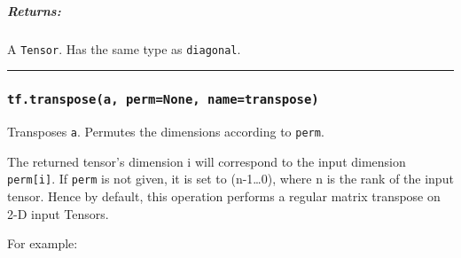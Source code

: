 \subparagraph{Returns: }\label{returns-23}

A \texttt{Tensor}. Has the same type as \texttt{diagonal}.

\begin{center}\rule{0.5\linewidth}{\linethickness}\end{center}

\subsubsection{\texorpdfstring{\texttt{tf.transpose(a,\ perm=None,\ name=\textquotesingle{}transpose\textquotesingle{})}
}{tf.transpose(a, perm=None, name='transpose') }}\label{tf.transposea-permnone-nametranspose}

Transposes \texttt{a}. Permutes the dimensions according to
\texttt{perm}.

The returned tensor's dimension i will correspond to the input dimension
\texttt{perm{[}i{]}}. If \texttt{perm} is not given, it is set to
(n-1\ldots{}0), where n is the rank of the input tensor. Hence by
default, this operation performs a regular matrix transpose on 2-D input
Tensors.

For example:

\begin{Shaded}
\begin{Highlighting}[]
\CommentTok{# 'x' is [[1 2 3]}
\CommentTok{#         [4 5 6]]}
\OperatorTok{==>} \NormalTok{[[} \NormalTok{]}
                     \NormalTok{[} \NormalTok{]}
                     \NormalTok{[} \NormalTok{]]}

\OperatorTok{=}\NormalTok{[}\NormalTok{, }\NormalTok{]) }\OperatorTok{==>} \NormalTok{[[} \NormalTok{]}
                                 \NormalTok{[} \NormalTok{]}
                                 \NormalTok{[} \NormalTok{]]}

\CommentTok{# 'x' is   [[[1  2  3]}
\CommentTok{#            [4  5  6]]}
\CommentTok{#           [[7  8  9]}
\CommentTok{#            [10 11 12]]]}
\OperatorTok{=}\NormalTok{[}\NormalTok{, }\NormalTok{, }\NormalTok{]) }\OperatorTok{==>} \NormalTok{[[[}  \NormalTok{]}
                                      \NormalTok{[}  \NormalTok{]}
                                      \NormalTok{[}  \NormalTok{]]}

                                     \NormalTok{[[} \NormalTok{]}
                                      \NormalTok{[} \NormalTok{]}
                                      \NormalTok{[} \NormalTok{]]]}
\end{Highlighting}
\end{Shaded}


